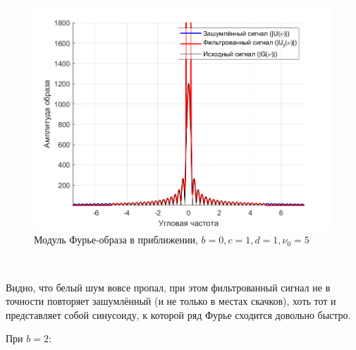 \documentclass[a4paper]{article}
\begin{document}
\begin{figure}[H]
    \centering
    \includegraphics[width=0.5\linewidth]{part2/0_1_1_Fourier_scaled.png}
    \caption{Модуль Фурье-образа в приближении, $b = 0, c = 1, d = 1, \nu_0 = 5$}
\end{figure}\

Видно, что белый шум вовсе пропал, при этом фильтрованный сигнал не в точности повторяет зашумлённый (и не только в местах скачков), хоть тот и представляет собой синусоиду, к которой ряд Фурье сходится довольно быстро.\

При $b = 2$:
\end{document}
